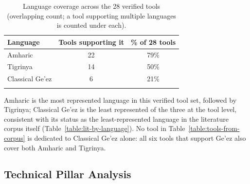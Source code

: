 \documentclass[sn-mathphys-num]{sn-jnl}
\theoremstyle{thmstyleone}
\theoremstyle{thmstyletwo}
\theoremstyle{thmstylethree}
\begin{document}
\begin{table}[h]
\caption{Language coverage across the 28 verified tools (overlapping count; a tool supporting multiple languages is counted under each).}\label{table:language}
\begin{tabular}{@{}lcc@{}}
\toprule
\textbf{Language} & \textbf{Tools supporting it} & \textbf{\% of 28 tools} \\
\midrule
Amharic & 22 & 79\% \\
Tigrinya & 14 & 50\% \\
Classical Ge'ez & 6 & 21\% \\
\botrule
\end{tabular}
\end{table}

\noindent Amharic is the most represented language in this verified tool set, followed by Tigrinya; Classical Ge'ez is the least represented of the three at the tool level, consistent with its status as the least-represented language in the literature corpus itself (Table~\ref{table:lit-by-language}). No tool in Table~\ref{table:tools-from-corpus} is dedicated to Classical Ge'ez alone: all six tools that support Ge'ez also cover both Amharic and Tigrinya.

\subsection{Technical Pillar Analysis}\label{sec:pillars}
\end{document}
